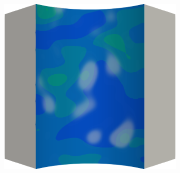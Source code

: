 \begin{frame}
\begin{columns}[T]
\begin{column}{0.6\textwidth}
\begin{figure}
{\begin{subfigure}{0.19\textwidth}
          \end{subfigure}
          \hspace{0.06\textwidth}
          \begin{subfigure}{0.19\textwidth}
            \centering
            \includegraphics[width=\textwidth]{examples/figures/ep.0006}
          \end{subfigure}
        }
        

\end{figure}
\end{column}
\end{columns}
\end{frame}
